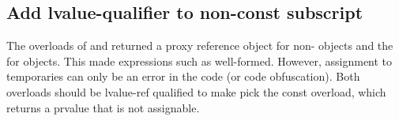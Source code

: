 %

\subsection{Add lvalue-qualifier to non-const subscript}\label{sec:lvalue-subscript}
The  overloads of  and  returned a
proxy reference object for non- objects and the 
for  objects.
This made expressions such as  well-formed.
However, assignment to temporaries can only be an error in the code (or code obfuscation).
Both  overloads should be lvalue-ref qualified to make
 pick the const overload, which returns a prvalue that is not
assignable.

